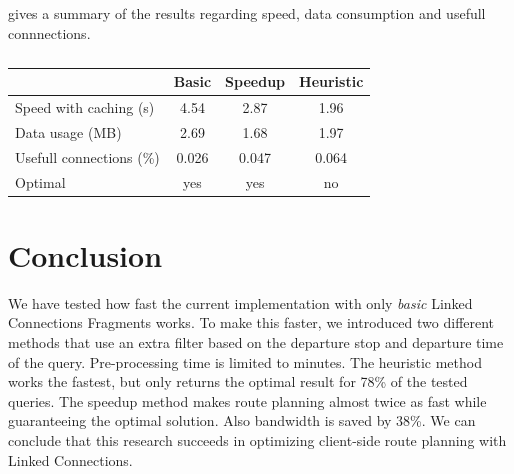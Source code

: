 \documentclass[twocolumn]{phdsymp} %
\begin{document}
 gives a summary of the results regarding speed, data consumption and usefull connnections.
\begin{table}[htbp]
\centering
\begin{tabular}{ | l || c | c | c |}
\hline
  & Basic & Speedup & Heuristic  \\ \hline
  Speed with caching (s) & 4.54 & 2.87 & 1.96 \\
  Data usage (MB) & 2.69 & 1.68 & 1.97 \\
  Usefull connections (\%) & 0.026 & 0.047 & 0.064 \\
  Optimal & yes & yes & no \\
\hline  
\end{tabular}
\caption{}
\label{table:summary}
\end{table}

\section{Conclusion}
We have tested how fast the current implementation with only \textit{basic} Linked Connections Fragments works. To make this faster, we introduced two different methods that use an extra filter based on the departure stop and departure time of the query. Pre-processing time is limited to minutes. The heuristic method works the fastest, but only returns the optimal result for 78\% of the tested queries. The speedup method makes route planning almost twice as fast while guaranteeing the optimal solution. Also bandwidth is saved by 38\%. We can conclude that this research succeeds in optimizing client-side route planning with Linked Connections.

\nocite{*}

\end{document}
